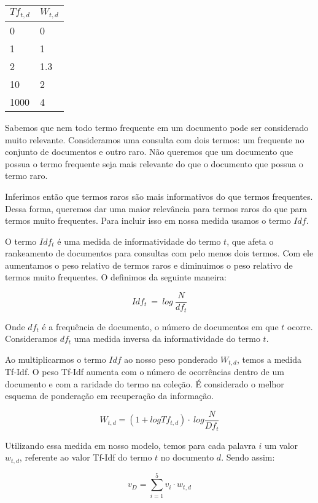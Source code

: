 \documentclass[a4paper,12pt]{article}
\begin{document}
 \begin{center}
  \begin{tabular}{ll}
    \hline
    $Tf_{t,d}$ & $W_{t,d}$\\
    \hline
    0&0\\
    1&1\\
    2&1.3\\
    10&2\\
    1000&4\\
    
  \end{tabular}
 \end{center}
 
 
  Sabemos que nem todo termo frequente em um documento pode ser considerado muito relevante. Consideramos uma consulta com dois termos:
  um frequente no conjunto de documentos e outro raro. Não queremos que um documento que possua o termo frequente seja mais relevante do que o
  documento que possua o termo raro.

  Inferimos então que termos raros são mais informativos do que termos frequentes. Dessa forma, queremos dar uma maior relevância para
  termos raros do que para termos muito frequentes. Para incluir isso em nossa medida usamos o termo $Idf$.
  
  O termo $Idf_{t}$ é uma medida de informatividade do termo $t$, que afeta o rankeamento de documentos para consultas com pelo menos dois
  termos. Com ele aumentamos o peso relativo de termos raros e diminuimos o peso relativo
  de termos muito frequentes. O definimos da seguinte maneira:
  
  $$ Idf_{t}\ = \ log\ \frac{N}{df_{t}}$$
  
  Onde $df_{t}$ é a frequência de documento, o número de documentos em que $t$ ocorre. Consideramos $df_{t}$ uma medida inversa da informatividade
  do termo $t$.
  
  Ao multiplicarmos o termo $Idf$ ao nosso peso ponderado $W_{t,d}$, temos a medida Tf-Idf. O peso Tf-Idf aumenta com o número de ocorrências
  dentro de um documento e com a raridade do termo na coleção. É considerado o melhor esquema de ponderação em recuperação da informação.
  
  $$ W_{t,d} = (1 + log Tf_{t,d}) \cdot \ log \dfrac{N}{Df_{t}}$$


 Utilizando essa medida em nosso modelo, temos para cada palavra $i$ um valor $w_{t,d}$, referente
  ao valor Tf-Idf do termo $t$ no documento $d$. Sendo assim:
  
  $$v_{D} = \sum_{i=1}^{5} v_{i} \cdot w_{t,d} $$
\end{document}
